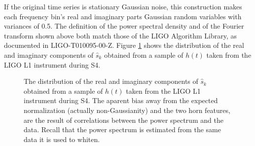 \documentclass[10pt]{article}
\begin{document}
If the original time series is stationary Gaussian noise, this construction
makes each frequency bin's real and imaginary parts Gaussian random
variables with variances of 0.5.  The definition of the power spectral
density and of the Fourier transform shown above both match those of the
LIGO Algorithm Library, as documented in LIGO-T010095-00-Z.  Figure
\ref{fig:shistogram} shows the distribution of the real and imaginary
components of \(\hat{s}_{k}\) obtained from a sample of \(h(t)\) taken from
the LIGO L1 instrument during S4.
\begin{figure}
\begin{center}
\end{center}
\caption{The distribution of the real and imaginary components of
\(\hat{s}_{k}\) obtained from a sample of \(h(t)\) taken from the LIGO L1
instrument during S4.  The aparent bias away from the expected
normalization (actually non-Gaussianity) and the two horn features, are the
result of correlations between the power spectrum and the data.  Recall
that the power spectrum is estimated from the same data it is used to
whiten.}
\label{fig:shistogram}
\end{figure}
\end{document}
